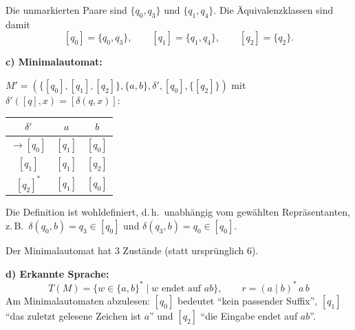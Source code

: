 \begin{loesung}
\medskip
Die unmarkierten Paare sind $\{q_0,q_3\}$ und $\{q_1,q_4\}$. Die Äquivalenzklassen sind damit
\[
  [q_0] = \{q_0, q_3\}, \qquad [q_1] = \{q_1, q_4\}, \qquad [q_2] = \{q_2\}.
\]

\textbf{c) Minimalautomat:}

$M' = (\{[q_0],[q_1],[q_2]\}, \{a,b\}, \delta', [q_0], \{[q_2]\})$ mit $\delta'([q],x) = [\delta(q,x)]$:

\begin{center}
\begin{tabular}{c|cc}
  $\delta'$ & $a$ & $b$ \\
  \hline
  $\to [q_0]$ & $[q_1]$ & $[q_0]$ \\
  $[q_1]$ & $[q_1]$ & $[q_2]$ \\
  $[q_2]^*$ & $[q_1]$ & $[q_0]$ \\
\end{tabular}
\end{center}

Die Definition ist wohldefiniert, d.\,h.\ unabhängig vom gewählten Repräsentanten, z.\,B.\ $\delta(q_0,b) = q_3 \in [q_0]$ und $\delta(q_3,b) = q_0 \in [q_0]$.

\begin{center}
\end{center}

Der Minimalautomat hat 3 Zustände (statt ursprünglich 6).

\textbf{d) Erkannte Sprache:}
\[
  T(M) = \{w \in \{a,b\}^* \mid w \text{ endet auf } ab\}, \qquad r = (a\mid b)^* \, a\, b
\]
Am Minimalautomaten abzulesen: $[q_0]$ bedeutet \enquote{kein passender Suffix}, $[q_1]$ \enquote{das zuletzt gelesene Zeichen ist $a$} und $[q_2]$ \enquote{die Eingabe endet auf $ab$}.
\end{loesung}

